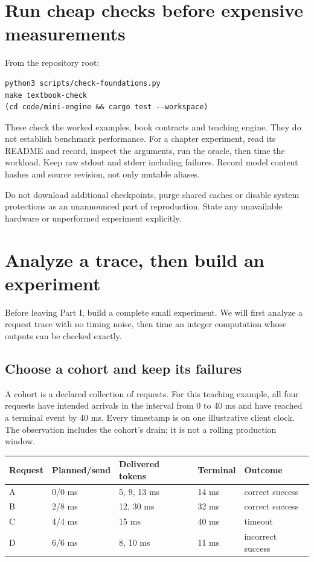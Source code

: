 \section{Run cheap checks before expensive measurements}
From the repository root:
\begin{verbatim}
python3 scripts/check-foundations.py
make textbook-check
(cd code/mini-engine && cargo test --workspace)
\end{verbatim}
These check the worked examples, book contracts and teaching engine.
They do not establish benchmark performance. For a chapter experiment,
read its README and record, inspect the arguments, run the oracle, then
time the workload. Keep raw stdout and stderr including failures.
Record model content hashes and source revision, not only mutable aliases.

Do not download additional checkpoints, purge shared caches or disable
system protections as an unannounced part of reproduction. State any
unavailable hardware or unperformed experiment explicitly.

\section{Analyze a trace, then build an experiment}
Before leaving Part I, build a complete small experiment. We will
first analyze a request trace with no timing noise, then time an
integer computation whose outputs can be checked exactly.

\subsection{Choose a cohort and keep its failures}
A cohort is a declared collection of requests. For this teaching
example, all four requests have intended arrivals in the interval
from 0 to 40 ms and have reached a terminal event by 40 ms.
Every timestamp is on one illustrative client clock. The observation
includes the cohort's drain; it is not a rolling production window.

\begin{center}
\begin{tabular}{@{}lllll@{}}
\toprule
Request & Planned/send & Delivered tokens & Terminal & Outcome\\\midrule
A & 0/0 ms & 5, 9, 13 ms & 14 ms & correct success\\
B & 2/8 ms & 12, 30 ms & 32 ms & correct success\\
C & 4/4 ms & 15 ms & 40 ms & timeout\\
D & 6/6 ms & 8, 10 ms & 11 ms & incorrect success\\
\bottomrule
\end{tabular}
\end{center}

